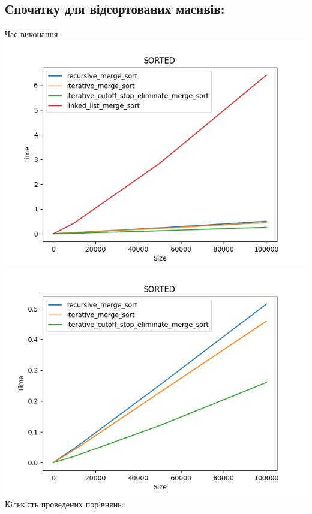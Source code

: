 \documentclass{article}
\begin{document}
    \subsection{Спочатку для відсортованих масивів:}
    Час виконання:
    \newline
        \includegraphics[scale=0.5]{sorted_Time_4_sorts_6_numbers_50_100to100000.png}
        \includegraphics[scale=0.5]{sorted_Time_3_sorts_6_numbers_50_100to100000.png}
    \newline
    Кiлькiсть проведених порiвнянь:
    \newline
\end{document}
